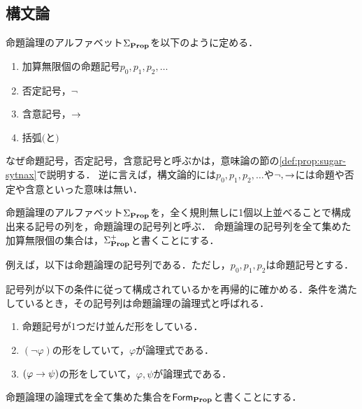 \subsection{構文論}

\begin{myDefinition}
  命題論理のアルファベット$\Sigma_{\mathbf{Prop}}$を以下のように定める．
  \begin{enumerate}
    \item 加算無限個の命題記号$p_0,p_1,p_2,\dots$
    \item 否定記号，$\neg$
    \item 含意記号，$\to$
    \item 括弧$($と$)$
  \end{enumerate}
\end{myDefinition}

\begin{myRemark}
  なぜ命題記号，否定記号，含意記号と呼ぶかは，意味論の節の\ref{def:prop:sugar-sytnax}で説明する．
  逆に言えば，構文論的には$p_0,p_1,p_2,\dots$や$\neg,\to$には命題や否定や含意といった意味は無い．
\end{myRemark}

\begin{myDefinition}[命題論理の記号列]
  命題論理のアルファベット$\Sigma_{\mathbf{Prop}}$を，全く規則無しに1個以上並べることで構成出来る記号の列を，命題論理の記号列と呼ぶ．
  命題論理の記号列を全て集めた加算無限個の集合は，$\Sigma_{\mathbf{Prop}}^+$と書くことにする．
\end{myDefinition}

\begin{myExample}[命題論理の記号列の例]
  例えば，以下は命題論理の記号列である．ただし，$p_0,p_1,p_2$は命題記号とする．
\end{myExample}

\begin{myDefinition}[命題論理の論理式]
  \label{def:prop:formulae}
  記号列が以下の条件に従って構成されているかを再帰的に確かめる．条件を満たしているとき，その記号列は命題論理の論理式と呼ばれる．
  \begin{enumerate}
    \item 命題記号が1つだけ並んだ形をしている．
    \item $(\neg \varphi)$の形をしていて，$\varphi$が論理式である．
    \item $(\varphi \to \psi)$の形をしていて，$\varphi, \psi$が論理式である．
  \end{enumerate}
  命題論理の論理式を全て集めた集合を$\mathsf{Form}_{\mathbf{Prop}}$と書くことにする．
\end{myDefinition}

